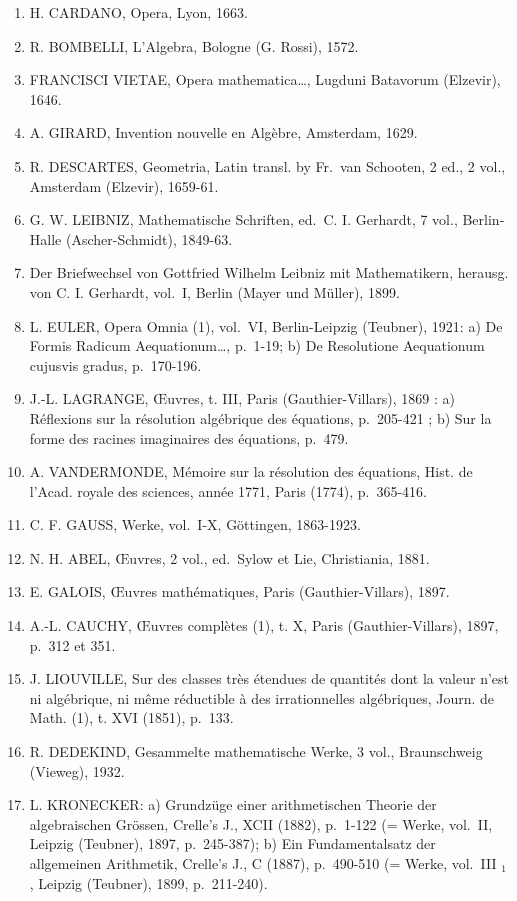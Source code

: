 \begin{enumerate}
\def\labelenumi{\arabic{enumi}.}
\setcounter{enumi}{2}
\item
  H. CARDANO, Opera, Lyon, 1663.
\item
  R. BOMBELLI, L'Algebra, Bologne (G. Rossi), 1572.
\item
  FRANCISCI VIETAE, Opera mathematica\ldots, Lugduni Batavorum (Elzevir), 1646.
\item
  A. GIRARD, Invention nouvelle en Algèbre, Amsterdam, 1629.
\item
  R. DESCARTES, Geometria, Latin transl. by Fr.~van Schooten, 2 ed., 2 vol., Amsterdam (Elzevir), 1659-61.
\item
  G. W. LEIBNIZ, Mathematische Schriften, ed.~C. I. Gerhardt, 7 vol., Berlin-Halle (Ascher-Schmidt), 1849-63.
\item
  Der Briefwechsel von Gottfried Wilhelm Leibniz mit Mathematikern, herausg. von C. I. Gerhardt, vol.~I, Berlin (Mayer und Müller), 1899.
\item
  L. EULER, Opera Omnia (1), vol.~VI, Berlin-Leipzig (Teubner), 1921: a) De Formis Radicum Aequationum\ldots, p.~1-19; b) De Resolutione Aequationum cujusvis gradus, p.~170-196.
\item
  J.-L. LAGRANGE, Œuvres, t. III, Paris (Gauthier-Villars), 1869 : a) Réflexions sur la résolution algébrique des équations, p.~205-421 ; b) Sur la forme des racines imaginaires des équations, p.~479.
\item
  A. VANDERMONDE, Mémoire sur la résolution des équations, Hist. de l'Acad. royale des sciences, année 1771, Paris (1774), p.~365-416.
\item
  C. F. GAUSS, Werke, vol.~I-X, Göttingen, 1863-1923.
\item
  N. H. ABEL, Œuvres, 2 vol., ed.~Sylow et Lie, Christiania, 1881.
\item
  E. GALOIS, Œuvres mathématiques, Paris (Gauthier-Villars), 1897.
\item
  A.-L. CAUCHY, Œuvres complètes (1), t. X, Paris (Gauthier-Villars), 1897, p.~312 et 351.
\item
  J. LIOUVILLE, Sur des classes très étendues de quantités dont la valeur n'est ni algébrique, ni même réductible à des irrationnelles algébriques, Journ. de Math. (1), t. XVI (1851), p.~133.
\item
  R. DEDEKIND, Gesammelte mathematische Werke, 3 vol., Braunschweig (Vieweg), 1932.
\item
  L. KRONECKER: a) Grundzüge einer arithmetischen Theorie der algebraischen Grössen, Crelle's J., XCII (1882), p.~1-122 (= Werke, vol.~II, Leipzig (Teubner), 1897, p.~245-387); b) Ein Fundamentalsatz der allgemeinen Arithmetik, Crelle's J., C (1887), p.~490-510 (= Werke, vol.~III \(_{1}\) , Leipzig (Teubner), 1899, p.~211-240).

\end{enumerate}
